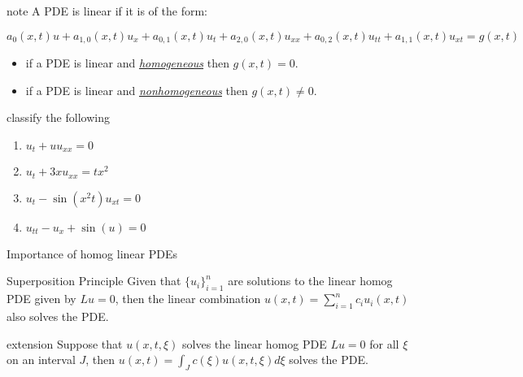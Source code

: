 \documentclass[t,10pt,fleqn]{beamer}
\def\ds{\displaystyle}
\newcommand{\tu}[1]{\underline{\textit{#1}}}
\begin{document}
\begin{frame}

\begin{block}{note}
       A PDE is linear if it is of the form:
      \begin{center}
                    $a_0(x,t) u + a_{1,0}(x,t) u_x  + a_{0,1}(x,t) u_t + a_{2,0}(x,t) u_{xx} +a_{0,2}(x,t) u_{tt}+ a_{1,1}(x,t) u_{xt}=g(x,t)$ 
      \end{center}
      
      \begin{itemize}
        \pause
          \item  if a PDE is linear and \tu{homogeneous} then $g(x,t)=0$.
         \pause
        \item    if a PDE is linear and \tu{nonhomogeneous} then $g(x,t) \neq 0$.
        \end{itemize}
        
 \end{block}         
     
           \pause

\begin{block}{classify the following}

  \begin{enumerate}
      \item  $u_t+u u_{xx}=0$
 
      \item $u_t +3 x u_{xx} = t x^2$
 
      \item $u_t - \sin(x^2t)u_{xt} = 0$        
      
       \item $u_{tt} -u_x + \sin(u) = 0$           
  \end{enumerate}
\end{block} 

   

 \end{frame}
 \begin{frame}{Importance of homog linear PDEs}

\begin{block}{Superposition Principle}
            Given that $\ds \{ u_i \}_{i=1}^n$ are solutions to the linear homog PDE given by $Lu=0$, \pause
            then the linear combination $\ds u(x,t) = \sum_{i=1}^n c_i u_i(x,t)$ also solves the PDE.
\end{block}
  
           \pause
  
\begin{block}{extension}
           Suppose that $u(x,t, \xi)$ solves the linear homog PDE $Lu=0$ for all $\xi$ on an interval $J$,  then  $\ds u(x,t) = \int_J c(\xi) u(x,t,\xi) d\xi$ solves the PDE.
\end{block}

  
   
 \end{frame}
\end{document}
